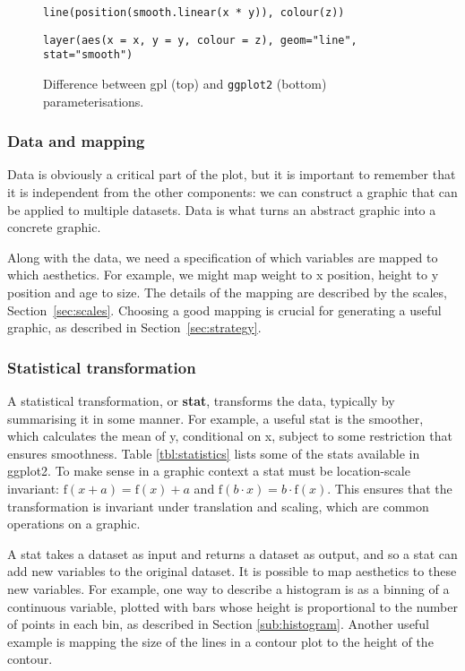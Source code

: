\begin{figure}[htbp]
  \verb|line(position(smooth.linear(x * y)), colour(z))|

  \verb|layer(aes(x = x, y = y, colour = z), geom="line", stat="smooth")|
  
  \caption{Difference between {\sc gpl} (top) and {\tt ggplot2} (bottom) parameterisations.}
  \label{fig:element-vs-layer}
\end{figure}

\subsubsection{Data and mapping}\label{sub:data_and_mapping} 

Data is obviously a critical part of the plot, but it is important to remember that it is independent from the other components: we can construct a graphic that can be applied to multiple datasets. Data is what turns an abstract graphic into a concrete graphic.

Along with the data, we need a specification of which variables are mapped to which aesthetics.  For example, we might map weight to x position, height to y position and age to size.  The details of the mapping are described by the scales, Section~\ref{sec:scales}.  Choosing a good mapping is crucial for generating a useful graphic, as described in Section~\ref{sec:strategy}.

\subsubsection{Statistical transformation}\label{sub:stats} 

A statistical transformation, or {\bf stat}, transforms the data, typically by summarising it in some manner.  For example, a useful stat is the smoother, which calculates the mean of y, conditional on x, subject to some restriction that ensures smoothness. Table \ref{tbl:statistics} lists some of the stats available in ggplot2.  To make sense in a graphic context a stat must be location-scale invariant: $\mbox{f}(x + a) = \mbox{f}(x) + a$ and $\mbox{f}(b \cdot x) = b \cdot \mbox{f}(x)$.  This ensures that the transformation is invariant under translation and scaling, which are common operations on a graphic.

A stat takes a dataset as input and returns a dataset as output, and so a stat can add new variables to the original dataset.  It is possible to map aesthetics to these new variables.  For example, one way to describe a histogram is as a binning of a continuous variable, plotted with bars whose height is proportional to the number of points in each bin, as described in Section \ref{sub:histogram}.  Another useful example is mapping the size of the lines in a contour plot to the height of the contour.

